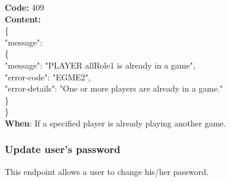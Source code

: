 \begin{itemize}
        
        \textbf{Code:} 409\\
        \textbf{Content:}\\
        \{\\
        \tab "message": \\
        \tab \{\\
        \tab \tab "message": "PLAYER allRole1 is already in a game",\\
        \tab \tab "error-code": "EGME2",\\
        \tab \tab "error-details": "One or more players are already in a game."\\
         \tab \}\\
        \}\\
        \textbf{When}: If a specified player is already playing another game.\\
\end{itemize}


\subsubsection*{Update user's password}
This endpoint allows a user to change his/her password.

